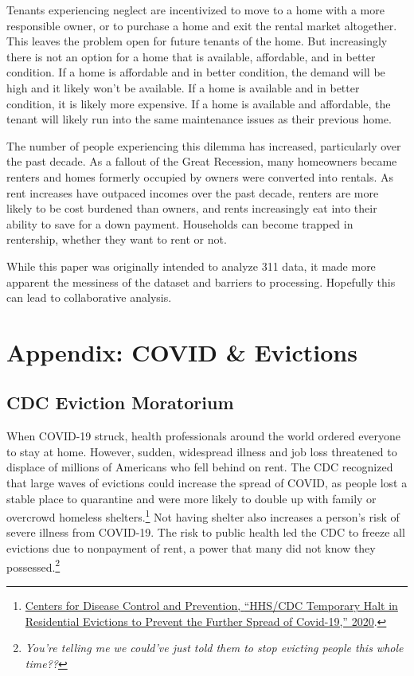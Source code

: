 \documentclass[
  openany]{book}
\begin{document}
Tenants experiencing neglect are incentivized to move to a home with a more responsible owner, or to purchase a home and exit the rental market altogether. This leaves the problem open for future tenants of the home. But increasingly there is not an option for a home that is available, affordable, and in better condition. If a home is affordable and in better condition, the demand will be high and it likely won't be available. If a home is available and in better condition, it is likely more expensive. If a home is available and affordable, the tenant will likely run into the same maintenance issues as their previous home.

The number of people experiencing this dilemma has increased, particularly over the past decade. As a fallout of the Great Recession, many homeowners became renters and homes formerly occupied by owners were converted into rentals. As rent increases have outpaced incomes over the past decade, renters are more likely to be cost burdened than owners, and rents increasingly eat into their ability to save for a down payment. Households can become trapped in rentership, whether they want to rent or not.

While this paper was originally intended to analyze 311 data, it made more apparent the messiness of the dataset and barriers to processing. Hopefully this can lead to collaborative analysis.

\hypertarget{appendix-covid-evictions}{%
\chapter{Appendix: COVID \& Evictions}\label{appendix-covid-evictions}}

\hypertarget{cdc-eviction-moratorium}{%
\section{CDC Eviction Moratorium}\label{cdc-eviction-moratorium}}

When COVID-19 struck, health professionals around the world ordered everyone to stay at home. However, sudden, widespread illness and job loss threatened to displace of millions of Americans who fell behind on rent. The CDC recognized that large waves of evictions could increase the spread of COVID, as people lost a stable place to quarantine and were more likely to double up with family or overcrowd homeless shelters.\footnote{\protect\hyperlink{ref-cdc2020a}{Centers for Disease Control and Prevention, {``HHS/CDC Temporary Halt in Residential Evictions to Prevent the Further Spread of Covid-19,''} 2020}.} Not having shelter also increases a person's risk of severe illness from COVID-19. The risk to public health led the CDC to freeze all evictions due to nonpayment of rent, a power that many did not know they possessed.\footnote{\emph{You're telling me we could've just told them to stop evicting people this whole time??}}
\end{document}
